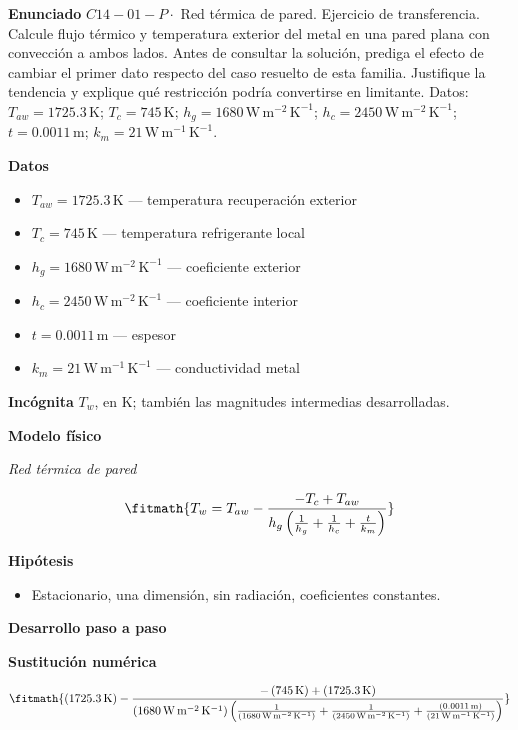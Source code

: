 \documentclass[10pt,openany]{book}
\begin{document}
\noindent\textbf{Enunciado}
\(C14-01-P \cdot\) Red térmica de pared. Ejercicio de transferencia. Calcule flujo térmico y temperatura exterior del metal en una pared plana con convección a ambos lados. Antes de consultar la solución, prediga el efecto de cambiar el primer dato respecto del caso resuelto de esta familia. Justifique la tendencia y explique qué restricción podría convertirse en limitante. Datos: \(T_{aw}=1725.3\, \mathrm{K}\); \(T_c=745\, \mathrm{K}\); \(h_g=1680\, \mathrm{W}\,\mathrm{m}^{-2}\,\mathrm{K}^{-1}\); \(h_c=2450\, \mathrm{W}\,\mathrm{m}^{-2}\,\mathrm{K}^{-1}\); \(t=0.0011\, \mathrm{m}\); \(k_m=21\, \mathrm{W}\,\mathrm{m}^{-1}\,\mathrm{K}^{-1}\).

\noindent\textbf{Datos}
\begin{itemize}
\item $T_{aw} = 1725.3\,\mathrm{K}$ — temperatura recuperación exterior
\item $T_c = 745\,\mathrm{K}$ — temperatura refrigerante local
\item $h_g = 1680\,\mathrm{W}\,\mathrm{m}^{-2}\,\mathrm{K}^{-1}$ — coeficiente exterior
\item $h_c = 2450\,\mathrm{W}\,\mathrm{m}^{-2}\,\mathrm{K}^{-1}$ — coeficiente interior
\item $t = 0.0011\,\mathrm{m}$ — espesor
\item $k_m = 21\,\mathrm{W}\,\mathrm{m}^{-1}\,\mathrm{K}^{-1}$ — conductividad metal
\end{itemize}

\noindent\textbf{Incógnita}
$T_w$, en $\mathrm{K}$; también las magnitudes intermedias desarrolladas.

\noindent\textbf{Modelo físico}

\noindent\textit{Red térmica de pared}

\[
\fitmath{T_w=T_{aw} - \frac{- T_c + T_{aw}}{h_g \left(\frac{1}{h_g} + \frac{1}{h_c} + \frac{t}{k_m}\right)}}
\]

\noindent\textbf{Hipótesis}
\begin{itemize}
\item Estacionario, una dimensión, sin radiación, coeficientes constantes.
\end{itemize}

\noindent\textbf{Desarrollo paso a paso}



\noindent\textbf{Sustitución numérica}

\[
\fitmath{\left(1725.3\,\mathrm{K}\right) - \frac{- \left(745\,\mathrm{K}\right) + \left(1725.3\,\mathrm{K}\right)}{\left(1680\,\mathrm{W}\,\mathrm{m}^{-2}\,\mathrm{K}^{-1}\right) \left(\frac{1}{\left(1680\,\mathrm{W}\,\mathrm{m}^{-2}\,\mathrm{K}^{-1}\right)} + \frac{1}{\left(2450\,\mathrm{W}\,\mathrm{m}^{-2}\,\mathrm{K}^{-1}\right)} + \frac{\left(0.0011\,\mathrm{m}\right)}{\left(21\,\mathrm{W}\,\mathrm{m}^{-1}\,\mathrm{K}^{-1}\right)}\right)}}
\]
\end{document}
